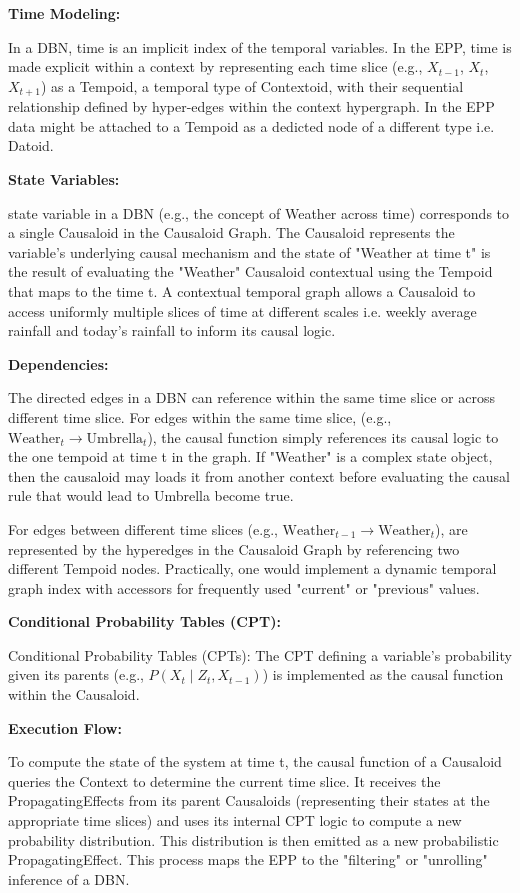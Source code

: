  \textbf{Time Modeling:}
 
 In a DBN, time is an implicit index of the temporal variables. In the EPP, time is made explicit within a
 context by representing each time slice (e.g., $X_{t-1}$, $X_t$, $X_{t+1}$) as a Tempoid, a temporal type of Contextoid, with their sequential relationship defined by hyper-edges within the context hypergraph. In the EPP data might be attached to a Tempoid as a dedicted node of a different type i.e. Datoid. 

 \textbf{State Variables:}
 
state variable in a DBN (e.g., the concept of Weather across time) corresponds to a single Causaloid in the Causaloid Graph. The Causaloid represents the variable's underlying causal mechanism and the state of "Weather at time t" is the result of evaluating the "Weather" Causaloid contextual using the Tempoid that maps to the time t. A contextual temporal graph allows a Causaloid to access uniformly multiple slices of time at different scales i.e. weekly average rainfall and today's rainfall to inform its causal logic. 

\textbf{Dependencies:}

The directed edges in a DBN can reference  within the same time slice or across different time slice.
For edges within the same time slice, (e.g., $\text{Weather}_t \to \text{Umbrella}_t$), the causal function simply references its causal logic to the one tempoid at time t in the graph. If "Weather" is a complex state object, then the causaloid may loads it from another context before evaluating the causal rule that would lead to Umbrella become true.

For edges between different time slices (e.g., $\text{Weather}_{t-1} \to \text{Weather}_t$),  are represented by the hyperedges in the Causaloid Graph by referencing two different Tempoid nodes. Practically, one would implement a dynamic temporal graph index with accessors for frequently used "current" or "previous" values. 


\textbf{Conditional Probability Tables (CPT):}

Conditional Probability Tables (CPTs): The CPT defining a variable's probability given its parents
(e.g., $P(X_t \mid Z_t, X_{t-1})$) is implemented as the causal function within the Causaloid.

\newpage

\textbf{Execution Flow:}

To compute the state of the system at time t, the causal function of a Causaloid queries the Context to determine the current time slice. It receives the PropagatingEffects from its parent Causaloids (representing their states at the appropriate time slices) and uses its internal CPT logic to compute a new probability distribution. This distribution is then emitted as a new probabilistic PropagatingEffect. This process maps the EPP to the "filtering" or "unrolling" inference of a DBN.

